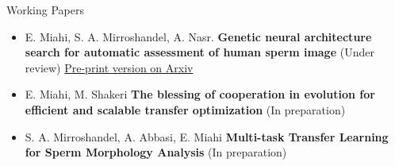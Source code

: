\documentclass[]{mcdowellcv}
\begin{document}
    \begin{cvsection}{Working Papers}
    	\begin{cvsubsection}{}{}{}
    	   \begin{itemize}
        	 \item E. Miahi, S. A. Mirroshandel, A. Nasr. \textbf{Genetic neural architecture search for automatic assessment of human sperm image} (Under review) \href{https://arxiv.org/abs/1909.09432}{Pre-print version on Arxiv}
        	 \item E. Miahi, M. Shakeri \textbf{The blessing of cooperation in evolution for efficient and scalable transfer optimization} (In preparation)
        	 \item S. A. Mirroshandel, A. Abbasi, E. Miahi \textbf{Multi-task Transfer Learning for Sperm Morphology Analysis} (In preparation)
        	\end{itemize}
         	 
    	\end{cvsubsection}

    \end{cvsection}
    
\end{document}
